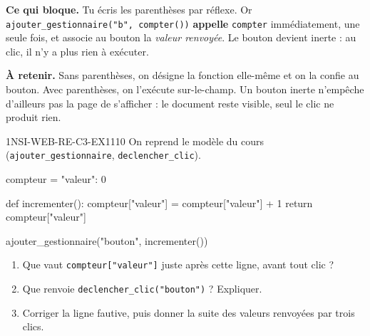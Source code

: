 

\textbf{Ce qui bloque.} Tu écris les parenthèses par réflexe. Or
\lstinline{ajouter_gestionnaire("b", compter())} \textbf{appelle} \lstinline{compter}
immédiatement, une seule fois, et associe au bouton la \emph{valeur renvoyée}. Le bouton
devient inerte : au clic, il n'y a plus rien à exécuter.

\textbf{À retenir.} Sans parenthèses, on désigne la fonction elle-même et on la confie au
bouton. Avec parenthèses, on l'exécute sur-le-champ. Un bouton inerte n'empêche d'ailleurs pas
la page de s'afficher : le document reste visible, seul le clic ne produit rien.

\begin{exercice}{1NSI-WEB-RE-C3-EX1}{1}{10}
On reprend le modèle du cours (\lstinline{ajouter_gestionnaire}, \lstinline{declencher_clic}).
\begin{python}
compteur = {"valeur": 0}

def incrementer():
    compteur["valeur"] = compteur["valeur"] + 1
    return compteur["valeur"]

ajouter_gestionnaire("bouton", incrementer())
\end{python}
\begin{enumerate}
  \item Que vaut \lstinline{compteur["valeur"]} juste après cette ligne, avant tout clic ?
  \item Que renvoie \lstinline{declencher_clic("bouton")} ? Expliquer.
  \item Corriger la ligne fautive, puis donner la suite des valeurs renvoyées par trois clics.
\end{enumerate}
\end{exercice}

